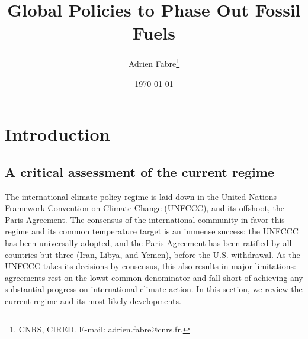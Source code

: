 \documentclass[12pt,english]{article}
\title{Global Policies to Phase Out Fossil Fuels }
\author{Adrien Fabre\footnote{CNRS, CIRED. E-mail: adrien.fabre@cnrs.fr.}}
\date{\today} %
\makeatletter
\renewcommand\tableofcontents{%
    \@starttoc{toc}%
}
\makeatother
\begin{document}
\sloppy
\maketitle



\begin{abstract}

\end{abstract}

\clearpage
\tableofcontents



\section{Introduction}%


\subsection{A critical assessment of the current regime}

The international climate policy regime is laid down in the United Nations Framework Convention on Climate Change (UNFCCC), and its offshoot, the Paris Agreement. The consensus of the international community in favor this regime and its common  temperature target is an immense success: the UNFCCC has been universally adopted, and the Paris Agreement has been ratified by all countries but three (Iran, Libya, and Yemen), before the U.S. withdrawal. As the UNFCCC takes its decisions by consensus, this also results in major limitations: agreements rest on the lowst common denominator and fall short of achieving any substantial progress on international climate action. In this section, we review the current regime and its most likely developments.
\end{document}
